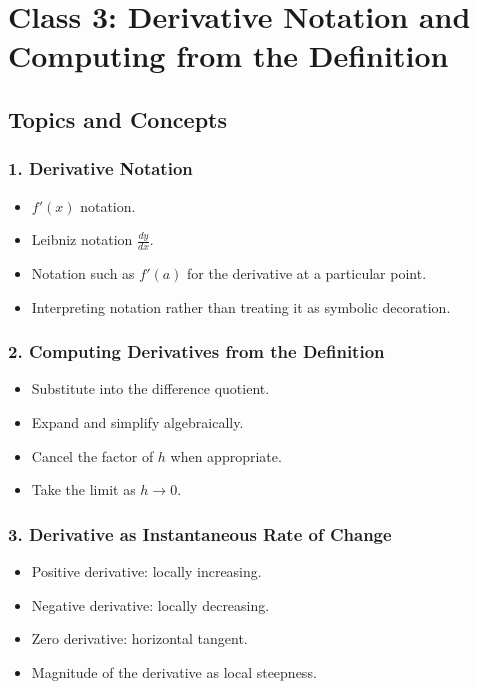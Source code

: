 \documentclass{article}
\begin{document}
\section*{Class 3: Derivative Notation and Computing from the Definition}

\subsection*{Topics and Concepts}

\subsubsection*{1. Derivative Notation}

\begin{itemize}
    \item $f'(x)$ notation.
    \item Leibniz notation $\frac{dy}{dx}$.
    \item Notation such as $f'(a)$ for the derivative at a particular point.
    \item Interpreting notation rather than treating it as symbolic decoration.
\end{itemize}

\subsubsection*{2. Computing Derivatives from the Definition}

\begin{itemize}
    \item Substitute into the difference quotient.
    \item Expand and simplify algebraically.
    \item Cancel the factor of $h$ when appropriate.
    \item Take the limit as $h\to0$.
\end{itemize}

\subsubsection*{3. Derivative as Instantaneous Rate of Change}

\begin{itemize}
    \item Positive derivative: locally increasing.
    \item Negative derivative: locally decreasing.
    \item Zero derivative: horizontal tangent.
    \item Magnitude of the derivative as local steepness.
\end{itemize}
\end{document}
